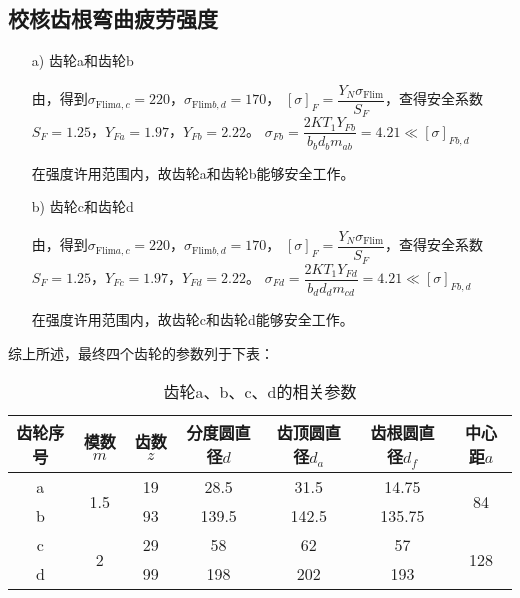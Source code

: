 \subsection{校核齿根弯曲疲劳强度}
\begin{itemize}
	\item[a)] 齿轮a和齿轮b
	\par 由\cite{2}，得到$\sigma_{\mathrm{Flim}a,c}=220$，$\sigma_{\mathrm{Flim}b,d}=170$，
	$\left[\sigma\right]_F=\dfrac{Y_N\sigma_{\mathrm{Flim}}}{S_F}$，查得安全系数$S_F=1.25$，$Y_{Fa}=1.97$，$Y_{Fb}=2.22$。
	$\sigma_{Fb}=\dfrac{2KT_1Y_{Fb}}{b_bd_bm_{ab}}=4.21\ll \left[\sigma\right]_{Fb,d}$ 
	\par 在强度许用范围内，故齿轮a和齿轮b能够安全工作。
	\item[b)] 齿轮c和齿轮d
	\par 由\cite{2}，得到$\sigma_{\mathrm{Flim}a,c}=220$，$\sigma_{\mathrm{Flim}b,d}=170$，
	$\left[\sigma\right]_F=\dfrac{Y_N\sigma_{\mathrm{Flim}}}{S_F}$，查得安全系数$S_F=1.25$，$Y_{Fc}=1.97$，$Y_{Fd}=2.22$。
	$\sigma_{Fd}=\dfrac{2KT_1Y_{Fd}}{b_dd_dm_{cd}}=4.21\ll \left[\sigma\right]_{Fb,d}$ 
	\par 在强度许用范围内，故齿轮c和齿轮d能够安全工作。
\end{itemize}
综上所述，最终四个齿轮的参数列于下表：
\begin{table}[H]
	\begin{center}
		\caption{齿轮a、b、c、d的相关参数}
		\begin{tabular}{ccccccc}
			\toprule
			齿轮序号 & 模数$m$ & 齿数$z$ & 分度圆直径$d$ & 齿顶圆直径$d_a$ & 齿根圆直径$d_f$ & 中心距$a$ \\
			\midrule
			a & \multirow{2}{*}{1.5} & 19 & 28.5 & 31.5 & 14.75 & \multirow{2}{*}{84} \\
			b & ~ & 93 & 139.5 & 142.5 & 135.75 & ~ \\
			c & \multirow{2}{*}{2} & 29 & 58 & 62 & 57 & \multirow{2}{*}{128} \\
			d & ~ & 99 & 198 & 202 & 193 & ~ \\
			\bottomrule
		\end{tabular}
	\end{center}
\end{table}